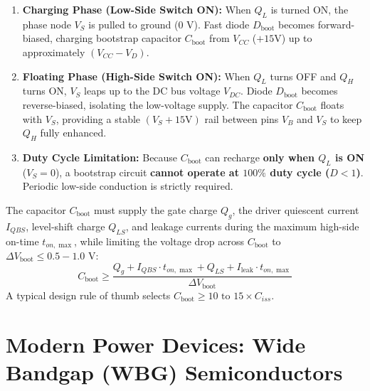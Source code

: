 \documentclass[11pt,a4paper]{article}
\begin{document}
\begin{conceptbox}
\begin{enumerate}[leftmargin=*]
  \item \textbf{Charging Phase (Low-Side Switch ON):} When $Q_L$ is turned ON, the phase node $V_S$ is pulled to ground ($0\text{ V}$). Fast diode $D_{\text{boot}}$ becomes forward-biased, charging bootstrap capacitor $C_{\text{boot}}$ from $V_{CC}$ ($+15\text{V}$) up to approximately $(V_{CC} - V_D)$.
  \item \textbf{Floating Phase (High-Side Switch ON):} When $Q_L$ turns OFF and $Q_H$ turns ON, $V_S$ leaps up to the DC bus voltage $V_{DC}$. Diode $D_{\text{boot}}$ becomes reverse-biased, isolating the low-voltage supply. The capacitor $C_{\text{boot}}$ floats with $V_S$, providing a stable $(V_S + 15\text{V})$ rail between pins $V_B$ and $V_S$ to keep $Q_H$ fully enhanced.
  \item \textbf{Duty Cycle Limitation:} Because $C_{\text{boot}}$ can recharge \textbf{only when $Q_L$ is ON} ($V_S = 0$), a bootstrap circuit \textbf{cannot operate at $100\%$ duty cycle ($D < 1$)}. Periodic low-side conduction is strictly required.
\end{enumerate}
\end{conceptbox}

\begin{formulabox}
The capacitor $C_{\text{boot}}$ must supply the gate charge $Q_g$, the driver quiescent current $I_{QBS}$, level-shift charge $Q_{LS}$, and leakage currents during the maximum high-side on-time $t_{on,\max}$, while limiting the voltage drop across $C_{\text{boot}}$ to $\Delta V_{\text{boot}} \le 0.5 - 1.0\text{ V}$:
\begin{equation}
C_{\text{boot}} \ge \frac{Q_g + I_{QBS} \cdot t_{on,\max} + Q_{LS} + I_{\text{leak}} \cdot t_{on,\max}}{\Delta V_{\text{boot}}}
\end{equation}
A typical design rule of thumb selects $C_{\text{boot}} \ge 10 \text{ to } 15 \times C_{iss}$.
\end{formulabox}

\section{Modern Power Devices: Wide Bandgap (WBG) Semiconductors}
\end{document}
